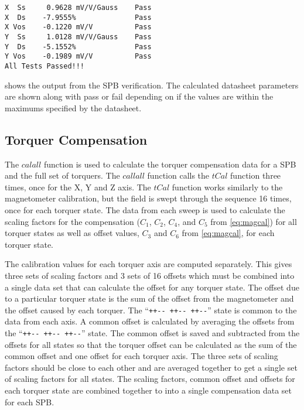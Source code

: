 \begin{minipage}{\linewidth}
\begin{lstlisting}[caption={\ac{SPB} verification results},label={lst:vspb-res},language=verbatim,style=verbatim]
X  Ss     0.9628 mV/V/Gauss    Pass
X  Ds    -7.9555%              Pass
X Vos    -0.1220 mV/V          Pass
Y  Ss     1.0128 mV/V/Gauss    Pass
Y  Ds    -5.1552%              Pass
Y Vos    -0.1989 mV/V          Pass
All Tests Passed!!!
\end{lstlisting}
\end{minipage}

 shows the output from the \ac{SPB} verification. The calculated datasheet parameters are shown along with pass or fail depending on if the values are within the maximums specified by the datasheet.


\subsection{Torquer Compensation}

\label{sec:tst-tq-comp}

The \lstMat$calall$ function is used to calculate the torquer compensation data for a \ac{SPB} and the full set of torquers. The \lstMat$callall$ function calls the \lstMat$tCal$ function three times, once for the X, Y and Z axis. The \lstMat$tCal$ function works similarly to the magnetometer calibration, but the field is swept through the sequence 16 times, once for each torquer state. The data from each sweep is used to calculate the scaling factors for the compensation ($C_1$, $C_2$, $C_4$, and $C_5$ from \cref{eq:magcal}) for all torquer states as well as offset values, $C_3$ and $C_6$ from \cref{eq:magcal}, for each torquer state.

The calibration values for each torquer axis are computed separately. This gives three sets of scaling factors and 3 sets of 16 offsets which must be combined into a single data set that can calculate the offset for any torquer state. The offset due to a particular torquer state is the sum of the offset from the magnetometer and the offset caused by each torquer. The \enquote{\texttt{++-{}- ++-{}- ++-{}-}} state is common to the data from each axis. A common offset is calculated by averaging the offsets from the \enquote{\texttt{++-{}- ++-{}- ++-{}-}} state. The common offset is saved and subtracted from the offsets for all states so that the torquer offset can be calculated as the sum of the common offset and one offset for each torquer axis. The three sets of scaling factors should be close to each other and are averaged together to get a single set of scaling factors for all states. The scaling factors, common offset and offsets for each torquer state are combined together to into a single compensation data set for each \ac{SPB}.

